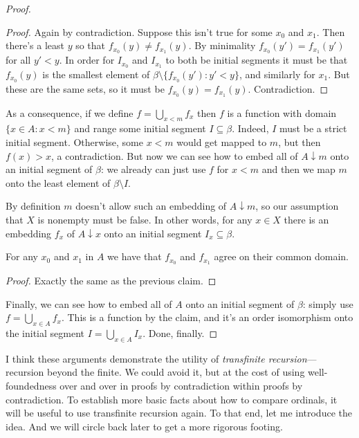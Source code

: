 \documentclass[10pt]{amsart}
\begin{document}
\begin{proof}
\begin{proof}
Again by contradiction. Suppose this isn't true for some $x_0$ and $x_1$. Then there's a least $y$ so that $f_{x_0}(y) \ne f_{x_1}(y)$. By minimality $f_{x_0}(y') = f_{x_1}(y')$ for all $y' < y$. In order for $I_{x_0}$ and $I_{x_1}$ to both be initial segments it must be that $f_{x_0}(y)$ is the smallest element of $\beta \setminus \{ f_{x_0}(y') : y' < y \}$, and similarly for $x_1$. But these are the same sets, so it must be $f_{x_0}(y) = f_{x_1}(y)$. Contradiction.
\end{proof}

As a consequence, if we define $f = \bigcup_{x < m} f_x$ then $f$ is a function with domain $\{x \in A : x < m\}$ and range some initial segment $I \subseteq \beta$. Indeed, $I$ must be a strict initial segment. Otherwise, some $x < m$ would get mapped to $m$, but then $f(x) > x$, a contradiction. But now we can see how to embed all of $A \downarrow m$ onto an initial segment of $\beta$: we already can just use $f$ for $x < m$ and then we map $m$ onto the least element of $\beta \setminus I$.

By definition $m$ doesn't allow such an embedding of $A \downarrow m$, so our assumption that $X$ is nonempty must be false. In other words, for any $x \in X$ there is an embedding $f_x$ of $A \downarrow x$ onto an initial segment $I_x \subseteq \beta$.

\begin{claim*}
For any $x_0$ and $x_1$ in $A$ we have that $f_{x_0}$ and $f_{x_1}$ agree on their common domain.
\end{claim*}

\begin{proof}
Exactly the same as the previous claim.
\end{proof}

Finally, we can see how to embed all of $A$ onto an initial segment of $\beta$: simply use $f = \bigcup_{x \in A} f_x$. This is a function by the claim, and it's an order isomorphism onto the initial segment $I = \bigcup_{x \in A} I_x$. Done, finally.
\end{proof}

I think these arguments demonstrate the utility of \emph{transfinite recursion}---recursion beyond the finite. We could avoid it, but at the cost of using well-foundedness over and over in proofs by contradiction within proofs by contradiction. To establish more basic facts about how to compare ordinals, it will be useful to use transfinite recursion again. To that end, let me introduce the idea. And we will circle back later to get a more rigorous footing.
\end{document}
